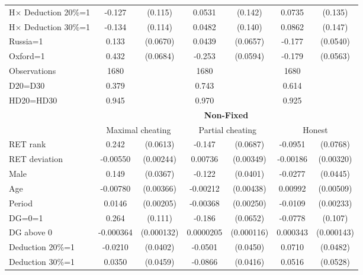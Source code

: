 \begin{tabular}{lcccccc}
H$\times$ Deduction 20\%=1&   -0.127         &  (0.115)&   0.0531         &  (0.142)&   0.0735         &  (0.135)\\
H$\times$ Deduction 30\%=1&   -0.134         &  (0.114)&   0.0482         &  (0.140)&   0.0862         &  (0.147)\\
Russia=1        &    0.133\sym{**} & (0.0670)&   0.0439         & (0.0657)&   -0.177\sym{***}& (0.0540)\\
Oxford=1        &    0.432\sym{***}& (0.0684)&   -0.253\sym{***}& (0.0594)&   -0.179\sym{***}& (0.0563)\\
\hline
Observations    &     1680         &         &     1680         &         &     1680         &         \\
D20=D30         &    0.379         &         &    0.743         &         &    0.614         &         \\
HD20=HD30       &    0.945         &         &    0.970         &         &    0.925         &         \\
\hline\hline
&\multicolumn{6}{c}{\bf Non-Fixed}\\
                &\multicolumn{2}{c}{Maximal cheating}&\multicolumn{2}{c}{Partial cheating}&\multicolumn{2}{c}{Honest}  \\
\hline
RET rank        &    0.242\sym{***}& (0.0613)&   -0.147\sym{**} & (0.0687)&  -0.0951         & (0.0768)\\
RET deviation   & -0.00550\sym{**} &(0.00244)&  0.00736\sym{**} &(0.00349)& -0.00186         &(0.00320)\\
Male            &    0.149\sym{***}& (0.0367)&   -0.122\sym{***}& (0.0401)&  -0.0277         & (0.0445)\\
Age             & -0.00780\sym{**} &(0.00366)& -0.00212         &(0.00438)&  0.00992\sym{*}  &(0.00509)\\
Period          &   0.0146\sym{***}&(0.00205)& -0.00368         &(0.00250)&  -0.0109\sym{***}&(0.00233)\\
DG=0=1          &    0.264\sym{**} &  (0.111)&   -0.186\sym{***}& (0.0652)&  -0.0778         &  (0.107)\\
DG above 0      &-0.000364\sym{***}&(0.000132)&0.0000205         &(0.000116)& 0.000343\sym{**} &(0.000143)\\
Deduction 20\%=1&  -0.0210         & (0.0402)&  -0.0501         & (0.0450)&   0.0710         & (0.0482)\\
Deduction 30\%=1&   0.0350         & (0.0459)&  -0.0866\sym{**} & (0.0416)&   0.0516         & (0.0528)\\

\end{tabular}

